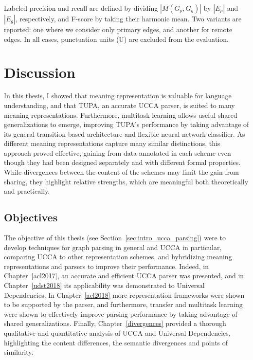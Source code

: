 \documentclass[12pt,a4paper,table]{report}
\begin{document}
Labeled precision and recall are defined by dividing $|M(G_p,G_g)|$ by $|E_p|$ and $|E_g|$, respectively,
and F-score by taking their harmonic mean.
Two variants are reported: one where we consider only primary edges,
and another for remote edges.
In all cases, punctuation units (U) are excluded from the evaluation.








\chapter{Discussion}

In this thesis, I showed that meaning representation is valuable for language understanding,
and that TUPA, an accurate UCCA parser, is suited to many meaning representations.
Furthermore, multitask learning allows useful shared generalizations to emerge,
improving TUPA's performance by taking advantage of its general transition-based
architecture and flexible neural network classifier.
As different meaning representations capture many similar distinctions,
this approach proved effective, gaining from data annotated in each scheme
even though they had been designed separately and with different formal properties.
While divergences between the content of the schemes may limit the gain from sharing,
they highlight relative strengths, which are meaningful both theoretically and practically.

\section{Objectives}

The objective of this thesis (see Section~\ref{sec:intro_ucca_parsing}) were to
develop techniques for graph parsing in general and UCCA in particular,
comparing UCCA to other representation schemes,
and hybridizing meaning representations and parsers to improve their performance.
Indeed, in Chapter~\ref{acl2017}, an accurate and efficient UCCA parser was presented,
and in Chapter~\ref{udst2018} its applicability was demonstrated to Universal Dependencies.
In Chapter~\ref{acl2018} more representation frameworks were shown to be supported by
the parser, and furthermore, transfer and multitask learning were shown to effectively
improve parsing performance by taking advantage of shared generalizations.
Finally, Chapter~\ref{divergences} provided a thorough qualitative and quantitative
analysis of UCCA and Universal Dependencies, highlighting the content differences,
the semantic divergences and points of similarity.
\end{document}
